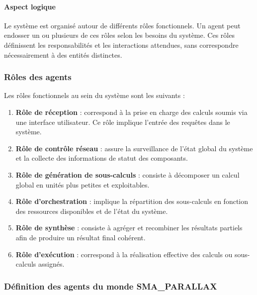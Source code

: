 \documentclass[12pt,a4paper]{report}
\theoremstyle{definition}
\begin{document}
\paragraph{Aspect logique}

Le système est organisé autour de différents rôles fonctionnels. Un agent peut endosser un ou plusieurs de ces rôles selon les besoins du système. Ces rôles définissent les responsabilités et les interactions attendues, sans correspondre nécessairement à des entités distinctes.

\subsubsection{Rôles des agents}

Les rôles fonctionnels au sein du système sont les suivants :

\begin{enumerate}
    \item \textbf{Rôle de réception} : correspond à la prise en charge des calculs soumis via une interface utilisateur. Ce rôle implique l’entrée des requêtes dans le système.

    \item \textbf{Rôle de contrôle réseau} : assure la surveillance de l’état global du système et la collecte des informations de statut des composants.

    \item \textbf{Rôle de génération de sous-calculs} : consiste à décomposer un calcul global en unités plus petites et exploitables.

    \item \textbf{Rôle d’orchestration} : implique la répartition des sous-calculs en fonction des ressources disponibles et de l’état du système.

    \item \textbf{Rôle de synthèse} : consiste à agréger et recombiner les résultats partiels afin de produire un résultat final cohérent.

    \item \textbf{Rôle d’exécution} : correspond à la réalisation effective des calculs ou sous-calculs assignés.
\end{enumerate}

\subsubsection{Définition des agents du monde SMA\_PARALLAX}
\end{document}
